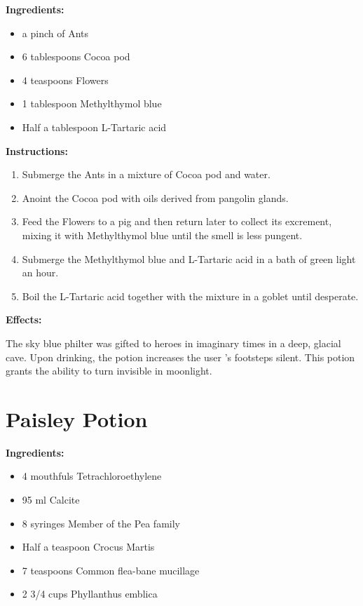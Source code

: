 \documentclass{article}
\begin{document}
\textbf{Ingredients:}

\begin{itemize}
  \item a pinch of Ants
  \item 6 tablespoons Cocoa pod
  \item 4 teaspoons Flowers
  \item 1 tablespoon Methylthymol blue
  \item Half a tablespoon L-Tartaric acid
\end{itemize}

\textbf{Instructions:}

\begin{enumerate}
  \item Submerge the Ants in a mixture of Cocoa pod and water.
  \item Anoint the Cocoa pod with oils derived from pangolin glands.
  \item Feed the Flowers to a pig and then return later to collect its excrement, mixing it with Methylthymol blue until the smell is less pungent.
  \item Submerge the Methylthymol blue and L-Tartaric acid in a bath of green light an hour.
  \item Boil the L-Tartaric acid together with the mixture in a goblet until desperate.
\end{enumerate}

\textbf{Effects:}

The sky blue philter was gifted to heroes in imaginary times in a deep, glacial cave. Upon drinking, the potion increases the user 's footsteps silent. This potion grants the ability to turn invisible in moonlight.

\newpage
\section*{Paisley Potion}

\textbf{Ingredients:}

\begin{itemize}
  \item 4 mouthfuls Tetrachloroethylene
  \item 95 ml Calcite
  \item 8 syringes Member of the Pea family
  \item Half a teaspoon Crocus Martis
  \item 7 teaspoons Common flea-bane mucillage
  \item 2 3/4 cups Phyllanthus emblica
\end{itemize}
\end{document}
